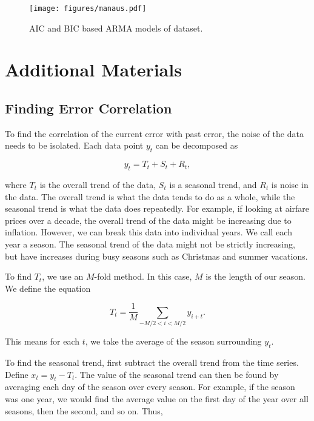 \begin{figure}[H]
\centering
\texttt{[image: figures/manaus.pdf]}
\caption{AIC and BIC based ARMA models of  dataset.}
\label{fig:manaus}
\end{figure}


\pagebreak

\section*{Additional Materials}

\subsection*{Finding Error Correlation}
To find the correlation of the current error with past error, the noise of the data needs to be isolated.
Each data point $y_t$ can be decomposed as

\begin{equation}
y_t=T_t+S_t+R_t,
\end{equation}

where $T_t$ is the overall trend of the data, $S_t$ is a seasonal trend, and $R_t$ is noise in the data.
The overall trend is what the data tends to do as a whole, while the seasonal trend is what the data does repeatedly.
For example, if looking at airfare prices over a decade, the overall trend of the data might be increasing due to inflation.
However, we can break this data into individual years.
We call each year a season.
The seasonal trend of the data might not be strictly increasing, but have increases during busy seasons such as Christmas and summer vacations.

To find $T_t$, we use an $M$-fold method.
In this case, $M$ is the length of our season.
We define the equation

\begin{equation}
T_t=\frac{1}{M}\sum_{-M/2<i<M/2}y_{i+t}.
\end{equation}

This means for each $t$, we take the average of the season surrounding $y_t$.

To find the seasonal trend, first subtract the overall trend from the time series.
Define $x_t=y_t-T_t$.
The value of the seasonal trend can then be found by averaging each day of the season over every season.
For example, if the season was one year, we would find the average value on the first day of the year over all seasons, then the second, and so on.
Thus,

